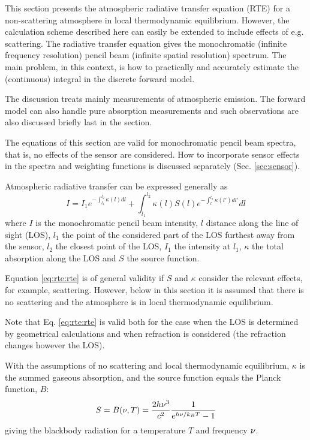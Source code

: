 %
%
This section presents the atmospheric radiative transfer equation
(RTE) for a non-scattering atmosphere in local thermodynamic
equilibrium.  However, the calculation scheme described here can
easily be extended to include effects of e.g. scattering. The
radiative transfer equation gives the monochromatic (infinite
frequency resolution) pencil beam (infinite spatial resolution)
spectrum. The main problem, in this context, is how to practically and
accurately estimate the (continuous) integral in the discrete forward
model.
 
The discussion treats mainly measurements of atmospheric emission. The 
forward model can also handle pure absorption measurements and such 
observations are also discussed briefly last in the section.

The equations of this section are valid for monochromatic pencil beam
spectra, that is, no effects of the sensor are considered. How to
incorporate sensor effects in the spectra and weighting functions is
discussed separately (Sec. \ref{sec:sensor}).



 \label{sec:rte:intro}
 
 Atmospheric radiative transfer can be expressed generally as
 \begin{equation}
   I = I_1e^{-\int_{l_1}^{l_2}{\kappa(l)dl}} +
        \int_{l_1}^{l_2}{\kappa(l)S(l)e^{-\int_{l}^{l_2}{\kappa(l')dl'}}dl}
    \label{eq:rte:rte}
 \end{equation}
 where $I$ is the monochromatic pencil beam intensity, $l$ distance
 along the line of sight (LOS), $l_1$ the point of the considered part
 of the LOS furthest away from the sensor, $l_2$ the closest point of
 the LOS, $I_1$ the intensity at $l_1$, $\kappa$ the total absorption along
 the LOS and $S$ the source function.
  
 Equation \ref{eq:rte:rte} is of general validity if $S$ and $\kappa$
 consider the relevant effects, for example, scattering. However, below in
 this section it is assumed that there is no scattering and the
 atmosphere is in local thermodynamic equilibrium.
  
 Note that Eq. \ref{eq:rte:rte} is valid both for the case when the LOS is
 determined by geometrical calculations and when refraction is
 considered (the refraction changes however the LOS).
  
 With the assumptions of no scattering and local thermodynamic
 equilibrium, $\kappa$ is the summed gaseous absorption, and the source
 function equals the Planck function, $B$:
 \begin{equation}
    S = B(\nu,T) = \frac{2h\nu^3}{c^2} \frac{1}{e^{h\nu/k_B T}-1}
    \label{eq:rte:planck}
 \end{equation}
 giving the blackbody radiation for a temperature $T$ and frequency
 $\nu$.
  

